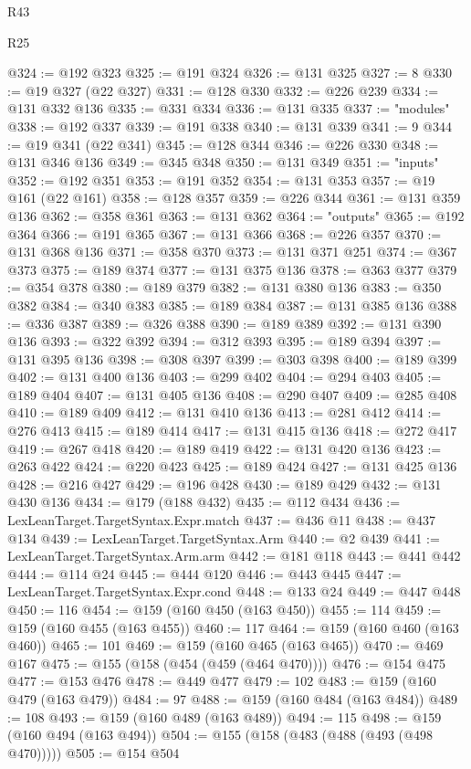 \begin{lexlean}{R43}
\begin{lexlean}{R25}
\begin{coremodule}
{{{{{{{{{{{{{{{{{{{{{{{{{{{{{{{{{{{{{{{{{{{{{{{{{{{{{{{{{{{{{{{{{{{{{{{{{{{{{{{{{{{{{{{{{{{{{{{{{{{{{{{{{{{{{{{{{{{{{{{{{{{{{{{{{{{{{{{{{{{{{{{{{{{{{{{{{{{{{{{{{{{{{{{{{{{{{{{{{{{{{{{{{{{{{{{{{@324 := @192 @323
@325 := @191 @324
@326 := @131 @325
@327 := 8
@330 := @19 @327 (@22 @327)
@331 := @128 @330
@332 := @226 @239
@334 := @131 @332 @136
@335 := @331 @334
@336 := @131 @335
@337 := "modules"
@338 := @192 @337
@339 := @191 @338
@340 := @131 @339
@341 := 9
@344 := @19 @341 (@22 @341)
@345 := @128 @344
@346 := @226 @330
@348 := @131 @346 @136
@349 := @345 @348
@350 := @131 @349
@351 := "inputs"
@352 := @192 @351
@353 := @191 @352
@354 := @131 @353
@357 := @19 @161 (@22 @161)
@358 := @128 @357
@359 := @226 @344
@361 := @131 @359 @136
@362 := @358 @361
@363 := @131 @362
@364 := "outputs"
@365 := @192 @364
@366 := @191 @365
@367 := @131 @366
@368 := @226 @357
@370 := @131 @368 @136
@371 := @358 @370
@373 := @131 @371 @251
@374 := @367 @373
@375 := @189 @374
@377 := @131 @375 @136
@378 := @363 @377
@379 := @354 @378
@380 := @189 @379
@382 := @131 @380 @136
@383 := @350 @382
@384 := @340 @383
@385 := @189 @384
@387 := @131 @385 @136
@388 := @336 @387
@389 := @326 @388
@390 := @189 @389
@392 := @131 @390 @136
@393 := @322 @392
@394 := @312 @393
@395 := @189 @394
@397 := @131 @395 @136
@398 := @308 @397
@399 := @303 @398
@400 := @189 @399
@402 := @131 @400 @136
@403 := @299 @402
@404 := @294 @403
@405 := @189 @404
@407 := @131 @405 @136
@408 := @290 @407
@409 := @285 @408
@410 := @189 @409
@412 := @131 @410 @136
@413 := @281 @412
@414 := @276 @413
@415 := @189 @414
@417 := @131 @415 @136
@418 := @272 @417
@419 := @267 @418
@420 := @189 @419
@422 := @131 @420 @136
@423 := @263 @422
@424 := @220 @423
@425 := @189 @424
@427 := @131 @425 @136
@428 := @216 @427
@429 := @196 @428
@430 := @189 @429
@432 := @131 @430 @136
@434 := @179 (@188 @432)
@435 := @112 @434
@436 := LexLeanTarget.TargetSyntax.Expr.match
@437 := @436 @11
@438 := @437 @134
@439 := LexLeanTarget.TargetSyntax.Arm
@440 := @2 @439
@441 := LexLeanTarget.TargetSyntax.Arm.arm
@442 := @181 @118
@443 := @441 @442
@444 := @114 @24
@445 := @444 @120
@446 := @443 @445
@447 := LexLeanTarget.TargetSyntax.Expr.cond
@448 := @133 @24
@449 := @447 @448
@450 := 116
@454 := @159 (@160 @450 (@163 @450))
@455 := 114
@459 := @159 (@160 @455 (@163 @455))
@460 := 117
@464 := @159 (@160 @460 (@163 @460))
@465 := 101
@469 := @159 (@160 @465 (@163 @465))
@470 := @469 @167
@475 := @155 (@158 (@454 (@459 (@464 @470))))
@476 := @154 @475
@477 := @153 @476
@478 := @449 @477
@479 := 102
@483 := @159 (@160 @479 (@163 @479))
@484 := 97
@488 := @159 (@160 @484 (@163 @484))
@489 := 108
@493 := @159 (@160 @489 (@163 @489))
@494 := 115
@498 := @159 (@160 @494 (@163 @494))
@504 := @155 (@158 (@483 (@488 (@493 (@498 @470)))))
@505 := @154 @504
}}}}}}}}}}}}}}}}}}}}}}}}}}}}}}}}}}}}}}}}}}}}}}}}}}}}}}}}}}}}}}}}}}}}}}}}}}}}}}}}}}}}}}}}}}}}}}}}}}}}}}}}}}}}}}}}}}}}}}}}}}}}}}}}}}}}}}}}}}}}}}}}}}}}}}}}}}}}}}}}}}}}}}}}}}}}}}}}}}}}}}}}}}}}}}}}}
\end{coremodule}
\end{lexlean}
\end{lexlean}
